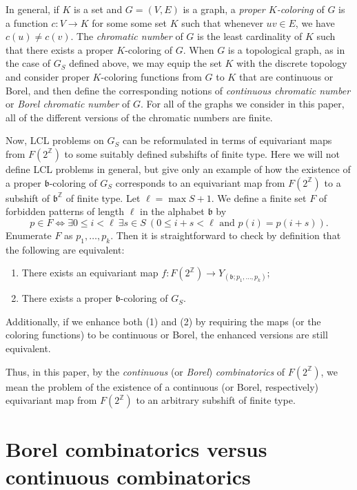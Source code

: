 \documentclass[11pt]{amsart}
\theoremstyle{definition}
\def\Z{\mathbb{Z}}
\def\Z{\mathbb{Z}}
\def\bsft{\mathfrak{b}}
\begin{document}
In general, if $K$ is a set and $G=(V,E)$ is a graph, a {\em proper $K$-coloring} of $G$ is a function $c\colon V\to K$ for some some set $K$ such that whenever $uv\in E$, we have $c(u)\neq c(v)$. The {\em chromatic number} of $G$ is the least cardinality of $K$ such that there exists a proper $K$-coloring of $G$. When $G$ is a topological graph, as in the case of $G_S$ defined above, we may equip the set $K$ with the discrete topology and consider proper $K$-coloring functions from $G$ to $K$ that are continuous or Borel, and then define the corresponding notions of {\em continuous chromatic number} or {\em Borel chromatic number} of $G$. For all of the graphs we consider in this paper, all of the different versions of the chromatic numbers are finite.



Now, LCL problems on $G_S$ can be reformulated in terms of equivariant maps from $F(2^\Z)$ to some suitably defined subshifts of finite type. Here we will not define LCL problems in general, but give only an example of how the existence of a proper $\bsft$-coloring of $G_S$ corresponds to an equivariant map from $F(2^\Z)$ to a subshift of $\bsft^\Z$ of finite type. Let $\ell=\max S+1$. We define a finite set $F$ of forbidden patterns of length $\ell$ in the alphabet $\bsft$  by
$$ p\in F\iff \exists 0\leq i<\ell\ \exists s\in S\ (0\leq i+s<\ell \mbox{ and } p(i)=p(i+s)). $$
Enumerate $F$ as $p_1,\dots, p_k$. Then it is straightforward to check by definition that the following are equivalent:
\begin{enumerate}
\item[(1)] There exists an equivariant map $f\colon F(2^\Z)\to Y_{(\bsft; p_1, \dots, p_k)}$;
\item[(2)] There exists a proper $\bsft$-coloring of $G_S$.
\end{enumerate}
Additionally, if we enhance both (1) and (2) by requiring the maps (or the coloring functions) to be continuous or Borel, the enhanced versions are still equivalent. 

Thus, in this paper, by the {\em continuous} (or {\em Borel}) {\em combinatorics} of $F(2^\Z)$, we mean the problem of the existence of a continuous (or Borel, respectively) equivariant map from $F(2^\Z)$ to an arbitrary subshift of finite type.

\section{Borel combinatorics versus continuous combinatorics}\label{sec:3}
\end{document}
